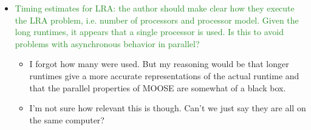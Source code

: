 \documentclass{elsarticle}
\newcommand{\fix}{\textsquare}
\newcommand{\easy}[1]{\textcolor{ForestGreen}{#1}}
\begin{document}
\begin{itemize}
\item[\fix] \easy{ Timing estimates for LRA: the author should make clear how they execute the LRA problem, i.e. number of processors and processor model. Given the long runtimes, it appears that a single processor is used. Is this to avoid problems with asynchronous behavior in parallel? }
\begin{itemize}
\item I forgot how many were used. But my reasoning would be that longer runtimes give a more accurate representations of the actual runtime and that the parallel properties of MOOSE are somewhat of a black box. 
\item I'm not sure how relevant this is though. Can't we just say they are all on the same computer?
\end{itemize}

\end{itemize}
\end{document}

